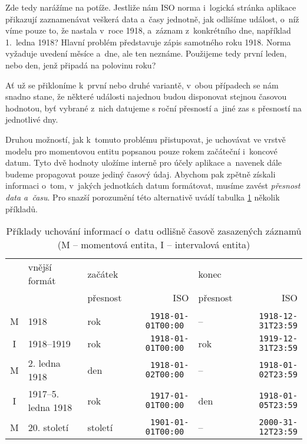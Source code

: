 			Zde tedy narážíme na potíže. Jestliže nám ISO norma i~logická stránka aplikace přikazují zaznamenávat veškerá data a~časy jednotně, jak odlišíme událost, o~níž víme pouze to, že nastala v~roce 1918, a~záznam z~konkrétního dne, například 1.~ledna 1918? Hlavní problém představuje zápis samotného roku 1918. Norma vyžaduje uvedení měsíce a~dne, ale ten neznáme. Použijeme tedy první leden, nebo den, jenž připadá na polovinu roku?
			
			Ať už se přikloníme k~první nebo druhé variantě, v~obou případech se nám snadno stane, že některé události najednou budou disponovat stejnou časovou hodnotou, byť vybrané z~nich datujeme s roční přesností a~jiné zas s přesností na jednotlivé dny.
			
			Druhou možností, jak k~tomuto problému přistupovat, je uchovávat ve vrstvě modelu pro momentovou entitu popsanou pouze rokem začáteční i~koncové datum. Tyto dvě hodnoty uložíme interně pro účely aplikace a~navenek dále budeme propagovat pouze jediný časový údaj. Abychom pak zpětně získali informaci o~tom, v~jakých jednotkách datum formátovat, musíme zavést \emph{přesnost data a~času}. Pro snazší porozumění této alternativě uvádí tabulka \ref{tab:precision-example} několik příkladů.
			
			\begin{table}[h!]
			\footnotesize
			\centering
				\begin{tabular}{|cl|lr|lr|}
				  \hline
					  & vnější formát & \multicolumn{2}{l|}{začátek} & \multicolumn{2}{l|}{konec} \\
					  &  & přesnost & ISO & přesnost & ISO \\
				  \hline\\[-3mm]
					M & 1918 & rok & \tt 1918-01-01T00:00 & -- & \tt 1918-12-31T23:59\\
					I & 1918--1919 & rok & \tt 1918-01-01T00:00 & rok & \tt 1919-12-31T23:59\\
					M & 2. ledna 1918 & den & \tt 1918-01-02T00:00 & -- & \tt 1918-01-02T23:59\\
					I & 1917--5. ledna 1918 & rok & \tt 1917-01-01T00:00 & den & \tt 1918-01-05T23:59\\
					M & 20. století & století & \tt 1901-01-01T00:00 & -- & \tt 2000-31-12T23:59\\
				  \hline
				\end{tabular}
				\caption{Příklady uchování informací o~datu odlišně časově zasazených záznamů (M -- momentová entita, I -- intervalová entita)}
				\label{tab:precision-example}
			\end{table}	
			
